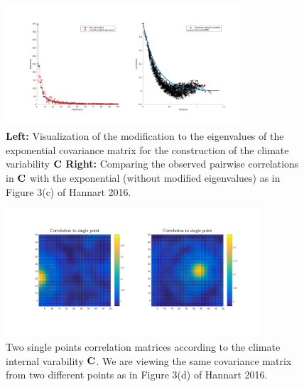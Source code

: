 \documentclass[12pt]{article}
\newcommand{\C}{\ensuremath{\text{Cov}}}
\def\C{\textbf{\text{C}}}
\begin{document}
\clearpage
\begin{figure}[htbp]
\begin{center}
\includegraphics[width=0.8\textwidth]{figures/checkExp.png}
\caption{\textbf{Left:} Visualization of the modification to the eigenvalues of the exponential covariance matrix for the construction of the climate variability $\C$ \textbf{Right:} Comparing the observed pairwise correlations in $\C$ with the exponential (without modified eigenvalues) as in Figure 3(c) of Hannart 2016.}
\label{fig:corr1}
\end{center}
\end{figure}

\begin{figure}[htbp]
\begin{center}
\includegraphics[width=0.85\textwidth]{figures/ptCorrelation.png}
\caption{Two single points correlation matrices according to the climate internal varability $\C$. We are viewing the same covariance matrix from two different points as in Figure 3(d) of Hannart 2016.}
\label{fig:corr2}
\end{center}
\end{figure}
\end{document}
